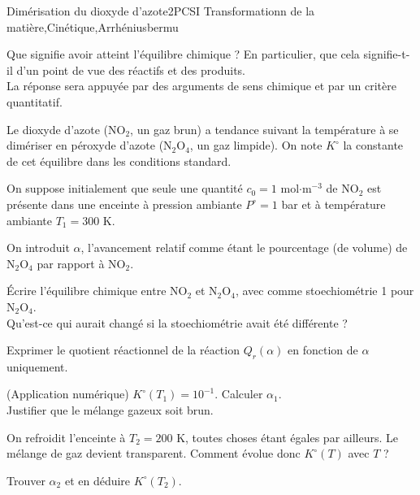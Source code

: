 
\begin{exercise}{Dimérisation du dioxyde d'azote}{2}{PCSI}
{Transformationn de la matière,Cinétique,Arrhénius}{bermu}

\begin{questions}
\questioncours Que signifie avoir atteint l'équilibre chimique ? En particulier, que cela signifie-t-il d'un point de vue des réactifs et des produits. \\
La réponse sera appuyée par des arguments de sens chimique et par un critère quantitatif.

\begin{EnvUplevel}
     Le dioxyde d'azote (NO$_2$, un gaz brun) a tendance suivant la température à se dimériser en péroxyde d'azote (N$_2$O$_4$, un gaz limpide). On note $K^\circ$ la constante de cet équilibre dans les conditions standard. 
     
     On suppose initialement que seule une quantité $c_0 = 1$ mol$\cdot$m$^{-3}$ de NO$_2$ est présente dans une enceinte à pression ambiante $P^\circ = 1$ bar et à température ambiante $T_1 = 300$ K.
     
     On introduit $\alpha$, l'avancement relatif comme étant le pourcentage (de volume) de N$_2$O$_4$ par rapport à NO$_2$.
\end{EnvUplevel}

\question \'Ecrire l'équilibre chimique entre NO$_2$ et N$_2$O$_4$, avec comme stoechiométrie 1 pour N$_2$O$_4$. \\
Qu'est-ce qui aurait changé si la stoechiométrie avait été différente ?

\question Exprimer le quotient réactionnel de la réaction $Q_r(\alpha)$ en fonction de $\alpha$ uniquement.

\question (\textsf{Application numérique}) $K^\circ(T_1) = 10^{-1}$. Calculer $\alpha_1$. \\
Justifier que le mélange gazeux soit brun.

\question On refroidit l'enceinte à $T_2 = 200$ K, toutes choses étant égales par ailleurs. Le mélange de gaz devient transparent. Comment évolue donc $K^\circ(T)$ avec $T$ ?


\question Trouver $\alpha_2$ et en déduire $K^\circ(T_2)$.


\end{questions}

\end{exercise}

